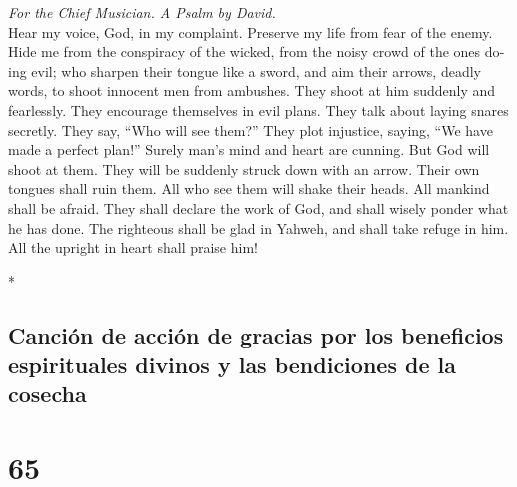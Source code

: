 \begin{paracol}{2}
\begin{otherlanguage}{english}
\emph{For the Chief Musician. A Psalm by David.}\\
 Hear my voice, God, in my complaint. Preserve my life
from fear of the enemy.  Hide me from the conspiracy of
the wicked, from the noisy crowd of the ones doing evil; 
who sharpen their tongue like a sword, and aim their arrows, deadly
words,  to shoot innocent men from ambushes. They shoot at
him suddenly and fearlessly.  They encourage themselves in
evil plans. They talk about laying snares secretly. They say, ``Who will
see them?''  They plot injustice, saying, ``We have made a
perfect plan!'' Surely man's mind and heart are cunning. 
But God will shoot at them. They will be suddenly struck down with an
arrow.  Their own tongues shall ruin them. All who see
them will shake their heads.  All mankind shall be afraid.
They shall declare the work of God, and shall wisely ponder what he has
done.  The righteous shall be glad in Yahweh, and shall
take refuge in him. All the upright in heart shall praise him!

\end{otherlanguage}

\switchcolumn[0]*

\hypertarget{canciuxf3n-de-acciuxf3n-de-gracias-por-los-beneficios-espirituales-divinos-y-las-bendiciones-de-la-cosecha}{%
\subsection{Canción de acción de gracias por los beneficios espirituales
divinos y las bendiciones de la
cosecha}\label{canciuxf3n-de-acciuxf3n-de-gracias-por-los-beneficios-espirituales-divinos-y-las-bendiciones-de-la-cosecha}}

\hypertarget{section-128}{%
\section{65}\label{section-128}}


\end{paracol}
